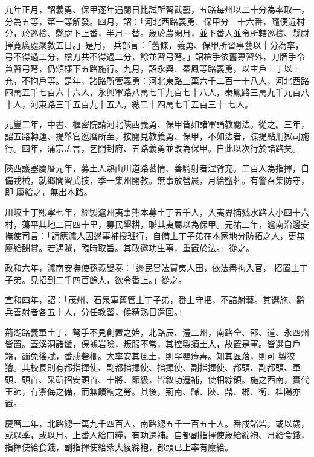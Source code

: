 \begin{pinyinscope}
 九年正月，詔義勇、保甲逐年遇閱日比試所習武藝，五路每州以二十分為率取一，分為五等，第一等解發。四月，詔：「河北西路義勇、保甲分三十六番，隨便近村分，於巡檢、縣尉下上番，半月一替。歲於農閑月，並下番人並令所轄巡檢、縣尉擇寬廣處聚教五日。」是月，
 兵部言：「舊條，義勇、保甲所習事藝以十分為率，弓不得過二分，槍刀共不得過二分，餘並習弓弩。」詔槍手依舊專習外，刀牌手令兼習弓弩，仍頒樣下五路施行。九月，詔永興、秦鳳等路義勇，以主戶三丁以上充，不拘戶等。是年，諸路所管義勇：河北東路三萬六千二百一十八人，河北西路四萬五千七百六十六人，永興軍路八萬七千九百七十八人，秦鳳路三萬九千九百八十人，河東路三千五百九十五人，總二十四萬七千五百三十
 七人。


元豐二年，中書、樞密院請河北陝西義勇、保甲皆如諸軍誦教閱法。從之。三年，詔五路轉運、提舉官巡曆所至，按閱見教義勇、保甲，不如法者，牒提點刑獄司施行。四年，蒲宗孟言，乞開封府、五路義勇並改為保甲。自此以次行於諸路矣。



 陝西護塞慶曆元年，募土人熟山川道路蕃情、善騎射者涅臂充。二百人為指揮，自備戎械，就鄉閭習武技，季一集州閱教。無事放營農，月給鹽茗。有警召集防守，即
 廩給之，無出本路。



 川峽土丁熙寧七年，經製瀘州夷事熊本募土丁五千人，入夷界捕戮水路大小四十六村，蕩平其地二百四十里，募民墾耕，聯其夷屬以為保甲。元祐二年，瀘南沿邊安撫使司言：「請應瀘人因邊事補授班行，自備土丁子弟在本家地分防拓之人，更無廩給酬賞。若遇賊，臨時取旨。其敢邀功生事，重置於法。」從之。



 政和六年，瀘南安撫使孫羲叟奏：「邊民冒法買夷人田，依法盡拘入官，
 招置土丁子弟。見招到二千四百餘人，欲令番上。」從之。



 宣和四年，詔：「茂州、石泉軍舊管土丁子弟，番上守把，不諳射藝。其選施、黔兵善射者各五十人，分任教習，候精熟日遣回。」



 荊湖路義軍土丁、弩手不見創置之始，北路辰、澧二州，南路全、邵、道、永四州皆置。蓋溪洞諸蠻，保據岩險，叛服不常，其控製須土人，故置是軍。皆選自戶籍，蠲免徭賦，番戍砦柵。大率安其風土，則罕嬰瘴毒。知其區落，則可
 製狡獪。其校長則有都指揮使、副都指揮使、指揮使、副指揮使、都頭、副都頭、軍頭、頭首、采斫招安頭首、十將、節級，皆敘功遷補，使相綜領。施之西南，實代王師，有禦侮之備，而無饋餉之勞。其後，荊南、歸、陝、鼎、郴、衡、桂陽亦置。



 慶曆二年，北路總一萬九千四百人，南路總五千一百五十人。番戍諸砦，或以歲，或以季，或以月。上番人給口糧，有功遷補。自都副指揮使歲給綿袍、月給食錢，指揮使給食錢，副指揮使給紫大綾綿袍，都頭已上率有廩給。




\end{pinyinscope}
